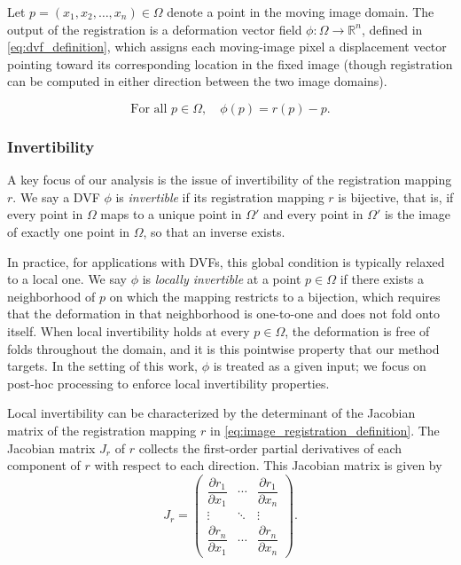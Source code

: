 Let $p = (x_1, x_2, \ldots, x_n) \in \Omega$ denote a point in the moving image domain. The output of the registration is a deformation vector field $\phi: \Omega \to \mathbb{R}^n$, defined in \autoref{eq:dvf_definition}, which assigns each moving-image pixel a displacement vector pointing toward its corresponding location in the fixed image (though registration can be computed in either direction between the two image domains). 

\begin{equation} \label{eq:dvf_definition}
    \text{For all } p \in \Omega, \quad \phi(p) = r(p) - p.
\end{equation}

\subsubsection{Invertibility}
\label{sec:invertibility}

A key focus of our analysis is the issue of invertibility of the registration mapping $r$. We say a DVF $\phi$ is \emph{invertible} if its registration mapping $r$ is bijective, that is, if every point in $\Omega$ maps to a unique point in $\Omega'$ and every point in $\Omega'$ is the image of exactly one point in $\Omega$, so that an inverse exists. 

In practice, for applications with DVFs, this global condition is typically relaxed to a local one. We say $\phi$ is \emph{locally invertible} at a point $p \in \Omega$ if there exists a neighborhood of $p$ on which the mapping restricts to a bijection, which requires that the deformation in that neighborhood is one-to-one and does not fold onto itself. When local invertibility holds at every $p \in \Omega$, the deformation is free of folds throughout the domain, and it is this pointwise property that our method targets. In the setting of this work, $\phi$ is treated as a given input; we focus on post-hoc processing to enforce local invertibility properties.

Local invertibility can be characterized by the determinant of the Jacobian matrix of the registration mapping $r$ in \autoref{eq:image_registration_definition}. The Jacobian matrix $J_r$ of $r$ collects the first-order partial derivatives of each component of $r$ with respect to each direction. This Jacobian matrix is given by
\begin{equation} \label{eq:general_jacobian_matrix}
    J_r = 
    \begin{pmatrix}
        \dfrac{\partial r_1}{\partial x_1} & \cdots & \dfrac{\partial r_1}{\partial x_n} \\[6pt]
        \vdots & \ddots & \vdots \\[6pt]
        \dfrac{\partial r_n}{\partial x_1} & \cdots & \dfrac{\partial r_n}{\partial x_n}
    \end{pmatrix}.
\end{equation}


